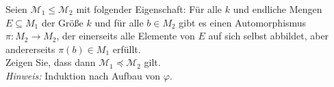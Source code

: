 
\begin{exercise}[203]

Seien $\mathscr{M}_1 \leq \mathscr{M}_2$ mit folgender Eigenschaft: Für alle $k$
und endliche Mengen $E \subseteq M_1$ der Größe $k$ und für alle $b \in M_2$
gibt es einen Automorphismus $\pi: M_2 \to M_2$, der einerseits alle Elemente von
$E$ auf sich selbst abbildet, aber andererseits $\pi(b) \in M_1$ erfüllt. \\
Zeigen Sie, dass dann $\mathscr{M}_1 \preccurlyeq \mathscr{M}_2$ gilt. \\
\textit{Hinweis:} Induktion nach Aufbau von $\varphi$.
\end{exercise}


